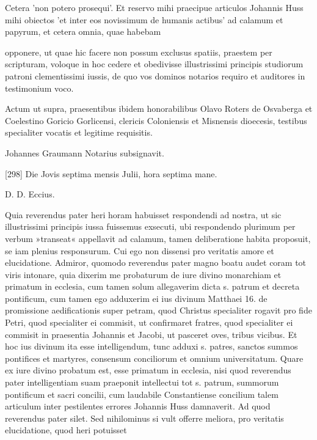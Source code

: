 Cetera 'non potero prosequi'. Et reservo mihi praecipue articulos Johannis Huss mihi obiectos 'et inter eos novissimum de humanis actibus' ad calamum et papyrum, et cetera omnia, quae habebam

opponere, ut quae hic facere non possum exclusus spatiis, praestem per scripturam, voloque in hoc cedere et obedivisse illustrissimi principis studiorum patroni clementissimi iussis, de quo vos dominos notarios requiro et auditores in testimonium voco.

Actum ut supra, praesentibus ibidem honorabilibus Olavo Roters de Osvaberga et Coelestino Goricio Gorlicensi, clericis Coloniensis et Misnensis dioecesis, testibus specialiter vocatis et legitime requisitis.

Johannes Graumann Notarius subsignavit.

[298] Die Jovis septima mensis Julii, hora septima mane.

D. D. Eccius.

Quia reverendus pater heri horam habuisset respondendi ad nostra, ut sic illustrissimi principis iussa fuissemus exsecuti, ubi respondendo plurimum per verbum »transeat« appellavit ad calamum, tamen deliberatione habita proposuit, se iam plenius responsurum. Cui ego non dissensi pro veritatis amore et elucidatione. Admiror, quomodo reverendus pater magno boatu audet coram tot viris intonare, quia dixerim me probaturum de iure divino monarchiam et primatum in ecclesia, cum tamen solum allegaverim dicta s. patrum et decreta pontificum, cum tamen ego adduxerim ei ius divinum Matthaei 16. de promissione aedificationis super petram, quod Christus specialiter rogavit pro fide Petri, quod specialiter ei commisit, ut confirmaret fratres, quod specialiter ei commisit in praesentia Johannis et Jacobi, ut pasceret oves, tribus vicibus. Et hoc ius divinum ita esse intelligendum, tunc adduxi s. patres, sanctos summos pontifices et martyres, consensum conciliorum et omnium universitatum. Quare ex iure divino probatum est, esse primatum in ecclesia, nisi quod reverendus pater intelligentiam suam praeponit intellectui tot s. patrum, summorum pontificum et sacri concilii, cum laudabile Constantiense concilium talem articulum inter pestilentes errores Johannis Huss damnaverit. Ad quod reverendus pater silet. Sed nihilominus si vult offerre meliora, pro veritatis elucidatione, quod heri potuisset

